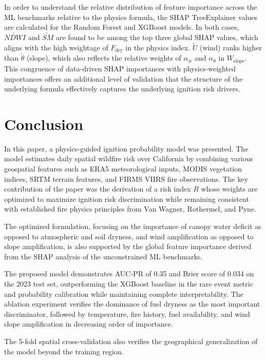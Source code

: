 \documentclass[conference]{IEEEtran}
\begin{document}
In order to understand the relative distribution of feature importance across the ML benchmarks relative to the physics formula, the SHAP TreeExplainer values are calculated for the Random Forest and XGBoost models. In both cases, $\widetilde{NDWI}$ and $\widetilde{SM}$ are found to be among the top three global SHAP values, which aligns with the high weightage of $F_{\mathrm{dry}}$ in the physics index. $\tilde{U}$ (wind) ranks higher than $\tilde{\theta}$ (slope), which also reflects the relative weights of $\alpha_w$ and $\alpha_\theta$ in $W_{\mathrm{slope}}$. This congruence of data-driven SHAP importances with physics-weighted importances offers an additional level of validation that the structure of the underlying formula effectively captures the underlying ignition risk drivers.

\section{Conclusion}

In this paper, a physics-guided ignition probability model was presented. The model estimates daily spatial wildfire risk over California by combining various geospatial features such as ERA5 meteorological inputs, MODIS vegetation indices, SRTM terrain features, and FIRMS VIIRS fire observations. The key contribution of the paper was the derivation of a risk index $R$ whose weights are optimized to maximize ignition risk discrimination while remaining consistent with established fire physics principles from Van Wagner, Rothermel, and Pyne.

The optimized formulation, focusing on the importance of canopy water deficit as opposed to atmospheric and soil dryness, and wind amplification as opposed to slope amplification, is also supported by the global feature importance derived from the SHAP analysis of the unconstrained ML benchmarks.

The proposed model demonstrates AUC-PR of 0.35 and Brier score of 0.034 on the 2023 test set, outperforming the XGBoost baseline in the rare event metric and probability calibration while maintaining complete interpretability. The ablation experiment verifies the dominance of fuel dryness as the most important discriminator, followed by temperature, fire history, fuel availability, and wind slope amplification in decreasing order of importance.

The 5-fold spatial cross-validation also verifies the geographical generalization of the model beyond the training region.
\end{document}
